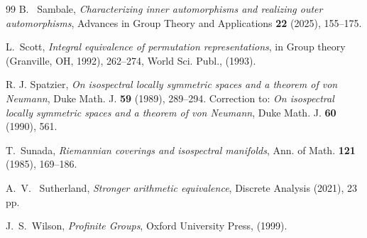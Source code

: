 \documentclass[11pt]{amsart}
\numberwithin{equation}{section}
\begin{document}
\begin{thebibliography}{99}
B. ~Sambale, \emph{Characterizing inner automorphisms and realizing outer automorphisms}, Advances in Group Theory and Applications {\bf 22} (2025), 155--175.

 L.~Scott, {\em Integral equivalence of permutation representations}, in Group theory (Granville, OH, 1992), 262--274, World Sci. Publ., (1993). 

 R. J. Spatzier, {\em On isospectral locally symmetric spaces and a theorem of von Neumann}, Duke Math. J. {\bf 59} (1989), 289--294. Correction to: {\em On isospectral locally symmetric spaces and a theorem of von Neumann}, Duke Math. J. {\bf 60} (1990), 561.

 T.~Sunada, {\em Riemannian coverings and isospectral manifolds}, Ann. of Math. {\bf 121} (1985), 169--186.

 A.~V. ~Sutherland, {\em Stronger arithmetic equivalence}, Discrete Analysis (2021), 23 pp.

 J.~S.~Wilson, \emph{Profinite Groups}, Oxford University Press, (1999). 

\end{thebibliography}
\end{document}
